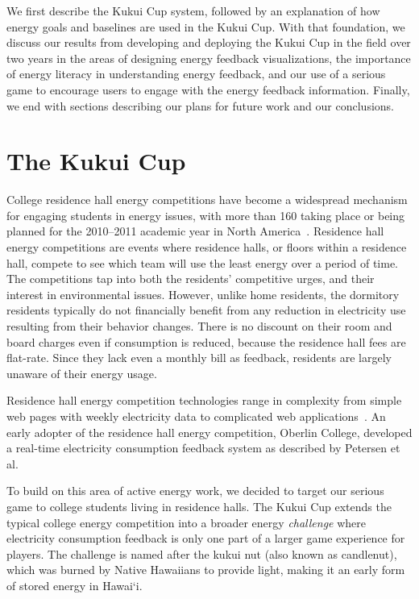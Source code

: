 \documentclass[10pt, conference, compsocconf]{IEEEtran-old}
\newcommand{\Hawaii}{Hawai`i\xspace}
\begin{document}
We first describe the Kukui Cup system, followed by an explanation of how energy goals and baselines are used in the Kukui Cup. With that foundation, we discuss our results from developing and deploying the Kukui Cup in the field over two years in the areas of designing energy feedback visualizations, the importance of energy literacy in understanding energy feedback, and our use of a serious game to encourage users to engage with the energy feedback information. Finally, we end with sections describing our plans for future work and our conclusions.


\section{The Kukui Cup}

College residence hall energy competitions have become a widespread mechanism for engaging students in energy issues, with more than 160 taking place or being planned for the 2010--2011 academic year in North America~\cite{Hodge2010}. Residence hall energy competitions are events where residence halls, or floors within a residence hall, compete to see which team will use the least energy over a period of time. The competitions tap into both the residents' competitive urges, and their interest in environmental issues. However, unlike home residents, the dormitory residents typically do not financially benefit from any reduction in electricity use resulting from their behavior changes. There is no discount on their room and board charges even if consumption is reduced, because the residence hall fees are flat-rate. Since they lack even a monthly bill as feedback, residents are largely unaware of their energy usage.

Residence hall energy competition technologies range in complexity from simple web pages with weekly electricity data to complicated web applications~\cite[pp. 6--11]{csdl2-11-01}. An early adopter of the residence hall energy competition, Oberlin College, developed a real-time electricity consumption feedback system as described by Petersen et al.~\cite{petersen-dorm-energy-reduction}

To build on this area of active energy work, we decided to target our serious game to college students living in residence halls. The Kukui Cup extends the typical college energy competition into a broader energy \emph{challenge} where electricity consumption feedback is only one part of a larger game experience for players. The challenge is named after the kukui nut (also known as candlenut), which was burned by Native Hawaiians to provide light, making it an early form of stored energy in \Hawaii.
\end{document}
